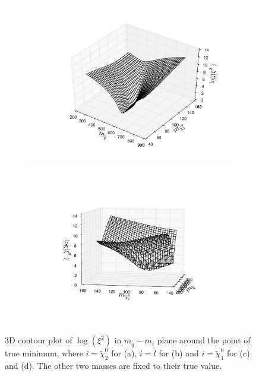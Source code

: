 \documentclass[twoside,english]{uiofysmaster}
\begin{document}
\begin{figure}[hbt]
	\begin{subfigure}[b]{0.49\textwidth}
		\includegraphics[width=\textwidth]{figures/3D_plot_xisquared_25_herwig_events_squark-chi1.pdf} 
		\caption{}
		\label{fig:3D_masses3}
	\end{subfigure}
	\begin{subfigure}[b]{0.49\textwidth}
		\includegraphics[width=\textwidth]{figures/3D_plot_xisquared_25_herwig_events_squark-chi1_rotated.pdf} 
		\caption{}
		\label{fig:3D_masses4}
	\end{subfigure}
	\caption{3D contour plot of $\log(\xi^2)$ in $m_{\tilde q}-m_i$ plane around the point of true minimum, where $i=\tilde \chi_2^0$ for (a), $i=\tilde l$ for (b) and $i=\tilde \chi_1^0$ for (c) and (d). The other two masses are fixed to their true value.}
	\label{fig:3D_masses}
\end{figure}
\end{document}
